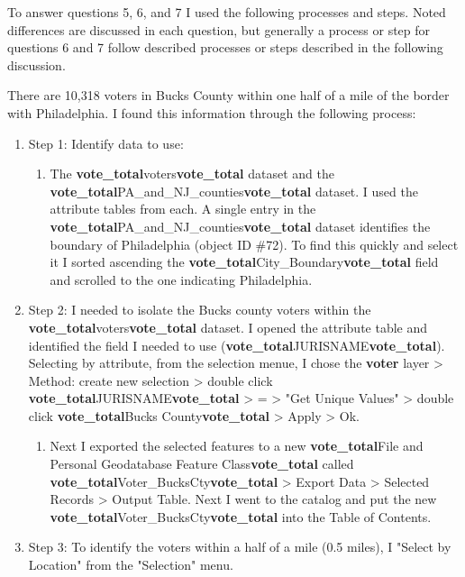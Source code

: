\documentclass[12pt]{article}
\begin{document}
To answer questions 5, 6, and 7 I used the following processes and steps.  Noted differences are discussed in each question, but generally a process or step for questions 6 and 7 follow described processes or steps described in the following discussion.

There are 10,318 voters in Bucks County within one half of a mile of the border with Philadelphia.  I found this information through the following process:

\begin{enumerate}
	\item Step 1:  Identify data to use:
	\begin{enumerate}
		\item The \textbf{vote\_total}voters\textbf{vote\_total} dataset and the \textbf{vote\_total}PA\_and\_NJ\_counties\textbf{vote\_total} dataset.  I used the attribute tables from each.  A single entry in the \textbf{vote\_total}PA\_and\_NJ\_counties\textbf{vote\_total} dataset identifies the boundary of Philadelphia (object ID \#72).  To find this quickly and select it I sorted ascending the \textbf{vote\_total}City\_Boundary\textbf{vote\_total} field and scrolled to the one indicating Philadelphia.
	\end{enumerate}
	\item Step 2:  I needed to isolate the Bucks county voters within the \textbf{vote\_total}voters\textbf{vote\_total} dataset.  I opened the attribute table and identified the field I needed to use (\textbf{vote\_total}JURISNAME\textbf{vote\_total}).  Selecting by attribute, from the selection menue, I chose the \textbf{voter} layer > Method: create new selection > double click \textbf{vote\_total}JURISNAME\textbf{vote\_total} > = > "Get Unique Values" > double click \textbf{vote\_total}Bucks County\textbf{vote\_total} > Apply > Ok.
	\begin{enumerate}
		\item Next I exported the selected features to a new \textbf{vote\_total}File and Personal Geodatabase Feature Class\textbf{vote\_total} called \textbf{vote\_total}Voter\_BucksCty\textbf{vote\_total} > Export Data > Selected Records > Output Table.  Next I went to the catalog and put the new \textbf{vote\_total}Voter\_BucksCty\textbf{vote\_total} into the Table of Contents.
	\end{enumerate}
	\item Step 3:  To identify the voters within a half of a mile (0.5 miles), I "Select by Location" from the "Selection" menu.  
	\begin{enumerate}

\end{enumerate}
\end{enumerate}
\end{document}
